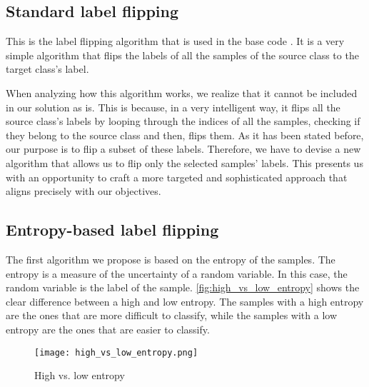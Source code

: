 \subsection{Standard label flipping}\label{sec:standard_label_flipping}
This is the label flipping algorithm that is used in the base code \cite{LFighter_code}. It is a very simple algorithm that flips the labels of all the samples of the source class to the target class's label.

When analyzing how this algorithm works, we realize that it cannot be included in our solution as is. This is because, in a very intelligent way, it flips all the source class's labels by looping through the indices of all the samples, checking if they belong to the source class and then, flips them. As it has been stated before, our purpose is to flip a subset of these labels. Therefore, we have to devise a new algorithm that allows us to flip only the selected samples' labels. This presents us with an opportunity to craft a more targeted and sophisticated approach that aligns precisely with our objectives.

\subsection{Entropy-based label flipping}\label{sec:entropy_label_flipping}
The first algorithm we propose is based on the entropy of the samples. The entropy is a measure of the uncertainty of a random variable. In this case, the random variable is the label of the sample. \autoref{fig:high_vs_low_entropy} shows the clear difference between a high and low entropy. The samples with a high entropy are the ones that are more difficult to classify, while the samples with a low entropy are the ones that are easier to classify.

\begin{figure}[h!]
        \centering
        \texttt{[image: high\_vs\_low\_entropy.png]}
        \caption{High vs. low entropy}
        \label{fig:high_vs_low_entropy}
\end{figure}

